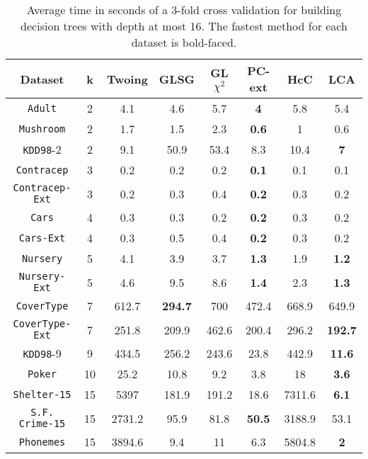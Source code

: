 \begin{table}[]
\scriptsize
\centering
\begin{tabular}{c|c|c|c|c|c|c|c}
Dataset             & k  & Twoing        & GLSG      & GL$\chi^2$  & PC-ext    & HcC    & LCA        \\
\hline
{\tt Adult}         & 2  & 4.1           & 4.6       & 5.7         &{\bf 4}    & 5.8    & 5.4        \\
{\tt Mushroom}      & 2  & 1.7           & 1.5       & 2.3         &{\bf 0.6}  & 1      & 0.6        \\
{\tt KDD98}-2       & 2  & 9.1           & 50.9      & 53.4        & 8.3       & 10.4   & {\bf 7}    \\
{\tt Contracep}     & 3  & 0.2           & 0.2       & 0.2         &{\bf 0.1}  & 0.1    & 0.1        \\
{\tt Contracep-Ext} & 3  & 0.2           & 0.3       & 0.4         &{\bf 0.2}  & 0.3    & 0.2        \\
{\tt Cars}          & 4  & 0.3           & 0.3       & 0.2         &{\bf 0.2}  & 0.3    & 0.2        \\
{\tt Cars-Ext}      & 4  & 0.3           & 0.5       & 0.4         &{\bf 0.2}  & 0.3    & 0.2        \\
{\tt Nursery}       & 5  & 4.1           & 3.9       & 3.7         &{\bf 1.3}  & 1.9    & {\bf 1.2}  \\
{\tt Nursery-Ext}   & 5  & 4.6           & 9.5       & 8.6         &{\bf 1.4}  & 2.3    & {\bf 1.3}  \\
{\tt CoverType}     & 7  & 612.7         &{\bf 294.7}& 700         & 472.4     & 668.9  & 649.9      \\
{\tt CoverType-Ext} & 7  & 251.8         & 209.9     & 462.6       & 200.4     & 296.2  & {\bf 192.7}\\
{\tt KDD98}-9       & 9  & 434.5         & 256.2     & 243.6       & 23.8      & 442.9  & {\bf 11.6} \\
{\tt Poker}         & 10 & 25.2          & 10.8      & 9.2         & 3.8       & 18     & {\bf 3.6}  \\
{\tt Shelter-15}    & 15 & 5397          & 181.9     & 191.2       & 18.6      & 7311.6 & {\bf 6.1}  \\
{\tt S.F. Crime-15} & 15 & 2731.2        & 95.9      & 81.8        &{\bf 50.5} & 3188.9 & 53.1       \\
{\tt Phonemes}      & 15 & 3894.6        & 9.4       & 11          & 6.3       & 5804.8 & {\bf 2 }
\end{tabular}
\caption{Average time in seconds of a 3-fold cross validation
for building decision trees with depth at most 16.
The fastest method for each dataset is bold-faced.}
\label{tab:time-16}
\end{table}


